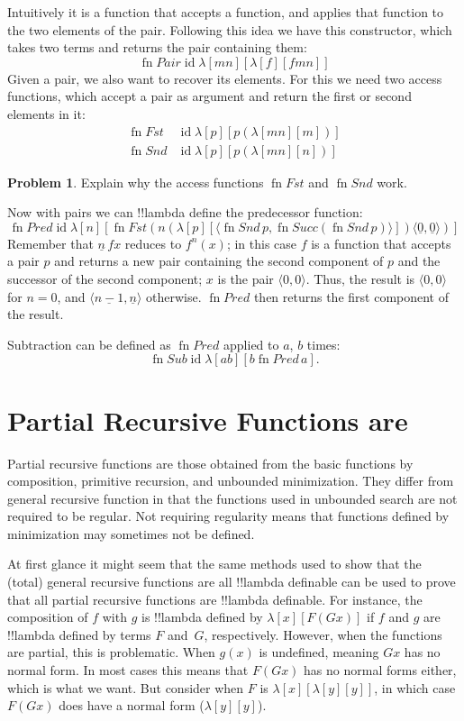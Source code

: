 \documentclass[10pt,a4paper]{article}
\theoremstyle{plain}
\theoremstyle{definition}
\newtheorem{prob}{Problem}[section]
\theoremstyle{remark}
\newcommand*{\olfileid}[3]{}
\newcommand*{\olsection}[1]{\section*{#1}}
\providecommand{\tuple}[1]{\langle #1 \rangle}
\providecommand{\num}[1]{\underline{#1}}
\providecommand{\lambd}{\ensuremath{\lambda}}
\providecommand{\ident}{\operatorname{id}}
\providecommand{\fn}{\operatorname{fn}}
\providecommand{\fn}{\operatorname{fn}}
\begin{document}
Intuitively it is a function that accepts a function, and applies that
function to the two elements of the pair. Following this idea we have
this constructor, which takes two terms and returns the pair containing
them:
\[
  \fn{Pair} \ident \lambd[mn][\lambd[f][fmn]]
\]
Given a pair, we also want to recover its elements.
For this we need two access functions, which accept a pair as argument and
return the first or second elements in it:
\begin{align*}
  \fn{Fst} & \ident \lambd[p][p(\lambd[mn][m])]\\
  \fn{Snd} & \ident \lambd[p][p(\lambd[mn][n])]
\end{align*}

\begin{prob}
  Explain why the access functions $\fn{Fst}$ and $\fn{Snd}$ work.
\end{prob}

Now with pairs we can !!{lambda define} the predecessor function:
\[
  \fn{Pred} \ident \lambd[n][\fn{Fst}(n (\lambd[p][\tuple{\fn{Snd}\, {p}, \fn{Succ}(\fn{Snd}\, {p})}]) \tuple{\num 0, \num 0})]
\]
Remember that $\num n\, f x$ reduces to $f^{n}(x)$; in this
case $f$ is a function that accepts a pair $p$ and returns a new
pair containing the second component of $p$ and the successor of the
second component; $x$ is the pair $\tuple{0,0}$. Thus, the
result is $\tuple{0,0}$ for $n=0$, and $\tuple{\num{n-1}, \num n}$
otherwise. $\fn{Pred}$ then returns the first component of the result.

Subtraction can be defined as $\fn{Pred}$ applied to $a$, $b$ times:
\[
\fn{Sub} \ident \lambd[ab][b \fn{Pred}\, a].
\]
    




\olfileid{lam}{ldf}{par}
\olsection{Partial Recursive Functions are \usetoken{S}{lambda definable}}

Partial recursive functions are those obtained from the basic
functions by composition, primitive recursion, and unbounded
minimization. They differ from general recursive function in that the
functions used in unbounded search are not required to be regular.
Not requiring regularity means that functions defined by minimization
may sometimes not be defined. 

At first glance it might seem that the same methods used to show that
the (total) general recursive functions are all !!{lambda definable} can
be used to prove that all partial recursive functions are
!!{lambda definable}.  For instance, the composition of $f$ with $g$ is
!!{lambda define}d by $\lambd[x][F (G x)]$ if $f$ and $g$ are
!!{lambda define}d by terms $F$ and~$G$, respectively. However, when the
functions are partial, this is problematic. When $g(x)$ is undefined,
meaning $G x$ has no normal form. In most cases this means that $F (G
x)$ has no normal forms either, which is what we want.  But consider
when $F$ is $\lambd[x][\lambd[y][y]]$, in which case $F (G x)$ does
have a normal form ($\lambd[y][y]$). 
\end{document}
